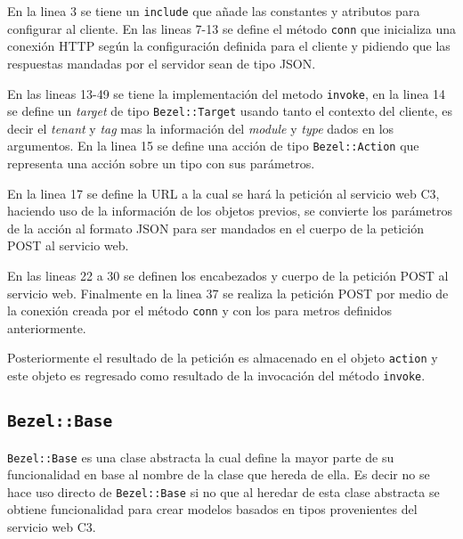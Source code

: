 

En la linea 3 se tiene un \texttt{include} que añade las constantes
y atributos para configurar al cliente. En las lineas 7-13 se define el método
\texttt{conn} que inicializa una conexión HTTP según la configuración definida
para el cliente y pidiendo que las respuestas mandadas por el servidor
sean de tipo JSON. 

En las lineas 13-49 se tiene la implementación del metodo \texttt{invoke}, en 
la linea 14 se define un \textit{target} de tipo \texttt{Bezel::Target} usando 
tanto el contexto del cliente, es decir el \textit{tenant} y \textit{tag} mas 
la información del \textit{module} y \textit{type} dados en los argumentos.
En la linea 15 se define una acción de tipo \texttt{Bezel::Action} que representa
una acción sobre un tipo con sus parámetros.

En la linea 17 se define la URL a la cual se hará la petición al servicio web C3,
haciendo uso de la información de los objetos previos, se convierte los parámetros
de la acción al formato JSON para ser mandados en el cuerpo de la petición POST
al servicio web.


En las lineas 22 a 30 se definen los encabezados y cuerpo de la petición POST al
servicio web. Finalmente en la linea 37 se realiza la petición POST por medio
de la conexión creada por el método \texttt{conn} y con los para metros definidos
anteriormente.

Posteriormente el resultado de la petición es almacenado en el objeto \texttt{action}
y este objeto es regresado como resultado de la invocación del método
\texttt{invoke}.

\subsection{\texttt{Bezel::Base}}

\texttt{Bezel::Base} es una clase abstracta la cual define la mayor parte de su
funcionalidad en base al nombre de la clase que hereda de ella. Es decir no se hace
uso directo de \texttt{Bezel::Base} si no que al heredar de esta clase abstracta
se obtiene funcionalidad para crear modelos basados en tipos provenientes
del servicio web C3.



